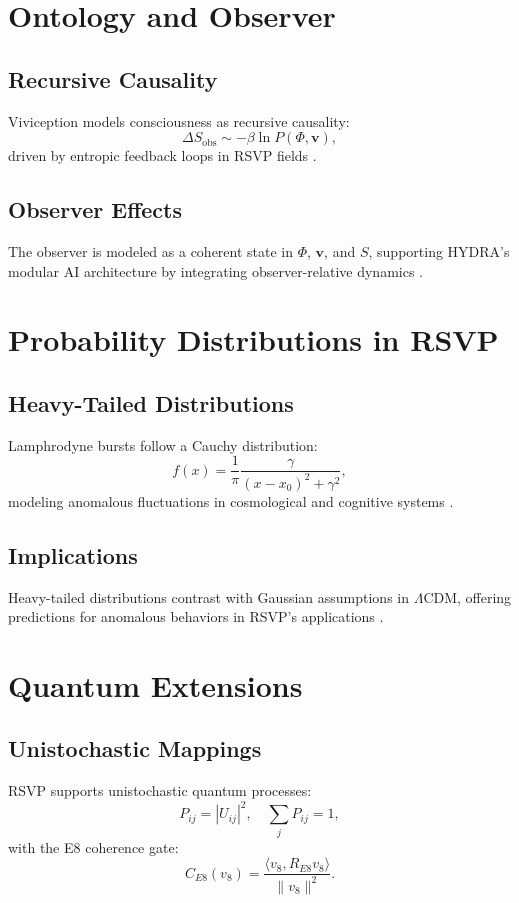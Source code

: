 \documentclass[12pt]{report}
\newcommand{\PhiRSVP}{\Phi}
\newcommand{\vRSVP}{\mathbf{v}}
\newcommand{\SRSVP}{S}
\begin{document}
\chapter{Ontology and Observer}
\label{app:O}
\section{Recursive Causality}
Viviception models consciousness as recursive causality:
\begin{equation}
\Delta \SRSVP_{\text{obs}} \sim -\beta \ln P(\PhiRSVP, \vRSVP), \label{eq:appO_viviception}
\end{equation}
driven by entropic feedback loops in RSVP fields \citep{Flyxion2025}.

\section{Observer Effects}
The observer is modeled as a coherent state in \(\PhiRSVP\), \(\vRSVP\), and \(\SRSVP\), supporting HYDRA’s modular AI architecture by integrating observer-relative dynamics \citep{RSVPMeta2025}.

\chapter{Probability Distributions in RSVP}
\label{app:P}
\section{Heavy-Tailed Distributions}
Lamphrodyne bursts follow a Cauchy distribution:
\begin{equation}
f(x) = \frac{1}{\pi} \frac{\gamma}{(x - x_0)^2 + \gamma^2}, \label{eq:appP_cauchy}
\end{equation}
modeling anomalous fluctuations in cosmological and cognitive systems \citep{RSVPMeta2025}.

\section{Implications}
Heavy-tailed distributions contrast with Gaussian assumptions in \(\Lambda\)CDM, offering predictions for anomalous behaviors in RSVP’s applications \citep{Flyxion2025}.

\chapter{Quantum Extensions}
\label{app:Q}
\section{Unistochastic Mappings}
RSVP supports unistochastic quantum processes:
\begin{equation}
P_{ij} = |U_{ij}|^2, \quad \sum_j P_{ij} = 1, \label{eq:appQ_unistochastic}
\end{equation}
with the E8 coherence gate:
\begin{equation}
C_{E8}(v_8) = \frac{\langle v_8, R_{E8} v_8 \rangle}{\|v_8\|^2}.
\end{equation}
\end{document}
